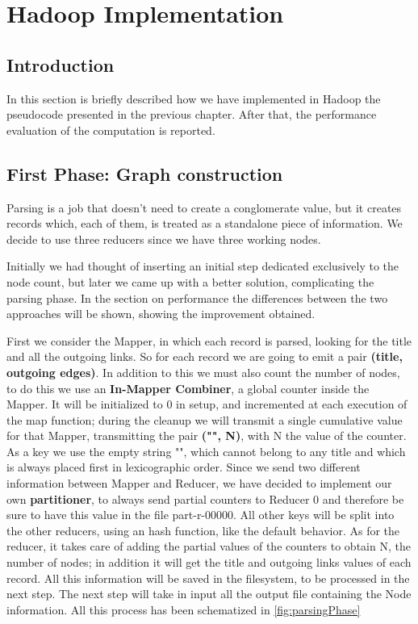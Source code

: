 \section{Hadoop Implementation}
\subsection{Introduction}
In this section is briefly described how we have implemented in Hadoop the pseudocode presented in the previous chapter. After that, the performance evaluation of the computation is reported.

\subsection{First Phase: Graph construction}
Parsing is a job that doesn't need to create a conglomerate value, but it creates records which, each of them, is treated as a standalone piece of information. We decide to use three reducers since we have three working nodes.

\noindent Initially we had thought of inserting an initial step dedicated exclusively to the node count, but later we came up with a better solution, complicating the parsing phase. In the section on performance the differences between the two approaches will be shown, showing the improvement obtained.

\noindent First we consider the Mapper, in which each record is parsed, looking for the title and all the outgoing links. So for each record we are going to emit a pair \textbf{(title, outgoing edges)}. In addition to this we must also count the number of nodes, to do this we use an \textbf{In-Mapper Combiner}, a global counter inside the Mapper. It will be initialized to 0 in setup, and incremented at each execution of the map function; during the cleanup we will transmit a single cumulative value for that Mapper, transmitting the pair \textbf{("", N)}, with N the value of the counter. As a key we use the empty string "", which cannot belong to any title and which is always placed first in lexicographic order.
Since we send two different information between Mapper and Reducer, we have decided to implement our own \textbf{partitioner}, to always send partial counters to Reducer 0 and therefore be sure to have this value in the file part-r-00000. All other keys will be split into the other reducers, using an hash function, like the default behavior.
As for the reducer, it takes care of adding the partial values of the counters to obtain N, the number of nodes; in addition it will get the title and outgoing links values of each record. All this information will be saved in the filesystem, to be processed in the next step. The next step will take in input all the output file containing the Node information. All this process has been schematized in \ref{fig:parsingPhase}


